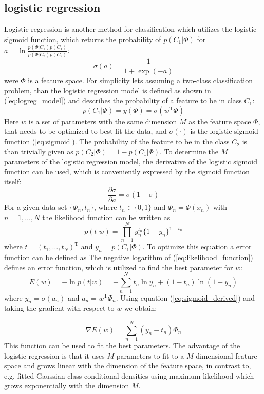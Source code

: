 \subsection{logistic regression}
Logistic regression is another method for classification which utilizes the logistic sigmoid function, which returns the probability of $p(C_1|\Phi)$ for $a = \ln\frac{p(\Phi|C_1)p(C_1)}{p(\Phi|C_2)p(C_2)}$:
\begin{equation} \label{eq:sigmoid}
\sigma(a) = \frac{1}{1 + \exp(-a)}
\end{equation}
were $\Phi$ is a feature space. 
For simplicity lets  assuming a two-class classification problem, than the logistic regression model is defined as shown in (\ref{eq:logreg_model}) and describes the probability of a feature to be in class $C_1$:
\begin{equation} \label{eq:logreg_model}
p(C_1|\Phi) = y(\Phi) = \sigma(w^\text{T}\Phi)
\end{equation}
Here $w$ is a set of parameters with the same dimension $M$ as the feature space $\Phi$, that needs to be optimized to best fit the data, and $\sigma(\cdot)$ is the logistic sigmoid function (\ref{eq:sigmoid}). The probability of the feature to be in the class $C_2$ is than trivially given as $p(C_2|\Phi) = 1 - p(C_1|\Phi)$. To determine the $M$ parameters of the logistic regression model, the derivative of the logistic sigmoid function can be used, which is conveniently expressed by the sigmoid function itself:
\begin{equation} \label{eq:sigmoid_derived}
\frac{\partial\sigma}{\partial a} = \sigma(1-\sigma)
\end{equation}
For a given data set $\{\Phi_n,t_n\}$, where $t_n \in \{0,1\}$ and $\Phi_n=\Phi(x_n)$ with $n = 1,  \dots, N$ the likelihood function can be written as
\begin{equation} \label{eq:likelihood_function}
p(t|w)=\prod_{n=1}^{N}y_n^{t_n} \{1-y_n\}^{1-t_n}
\end{equation}
where $t=(t_1, \dots, t_N)^\text{T}$ and $y_n=p(C_1|\Phi)$. To optimize this equation a error function can be defined as 
The negative logarithm of (\ref{eq:likelihood_function}) defines an error function, which is utilized to find the best parameter for $w$:
\begin{equation} \label{eq:likelihood_function}
E(w)=-\ln p(t|w) = - \sum_{n=1}^{N}t_n \ln y_n + (1-t_n) \ln (1-y_n)
\end{equation}
where $y_n=\sigma(a_n)$ and $a_n=w^\text{T}\Phi_n$. Using equation (\ref{eq:sigmoid_derived}) and taking the gradient with respect to $w$ we obtain:


\begin{equation} \label{eq:likelihood_function}
\nabla E(w)=\sum_{n=1}^{N} (y_n-t_n)\Phi_n
\end{equation}
This function can be used to fit the best parameters.
The advantage of the logistic regression is that it uses $M$ parameters to fit to a $M$-dimensional feature space and grows linear with the dimension of the feature space, in contrast to, e.g. fitted Gaussian class conditional densities using maximum likelihood which grows exponentially with the dimension $M$.